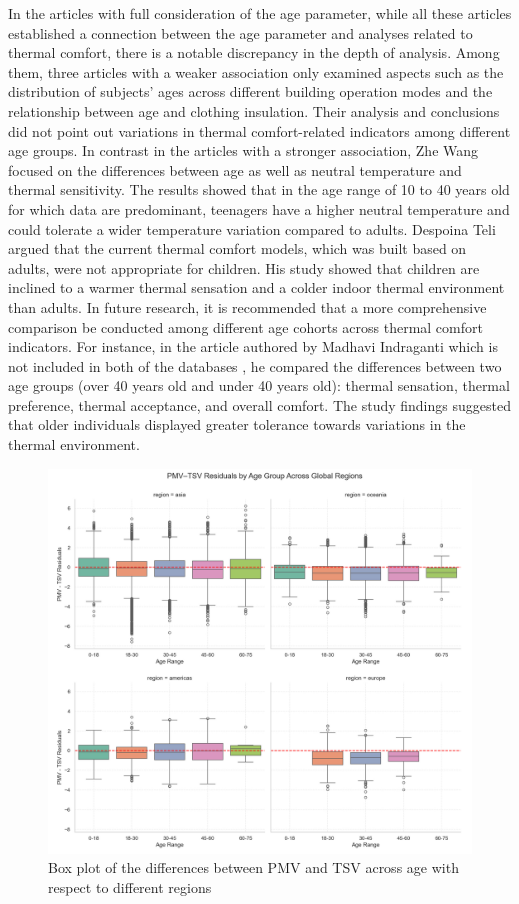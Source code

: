 \documentclass[final,3p,times,12pt]{elsarticle}
\begin{document}
In the articles with full consideration of the age parameter, while all these articles established a connection between the age parameter and analyses related to thermal comfort, there is a notable discrepancy in the depth of analysis. Among them, three articles with a weaker association \cite{honnekeriComfortAdaptationMixedmode,tartariniThermalPerceptionsPreferences2018,vecchiThermalHistoryIts} only examined aspects such as the distribution of subjects' ages across different building operation modes and the relationship between age and clothing insulation. Their analysis and conclusions did not point out variations in thermal comfort-related indicators among different age groups. In contrast in the articles with a stronger association, Zhe Wang \cite{wangRevisitingIndividualGroup2020b} focused on the differences between age as well as neutral temperature and thermal sensitivity. The results showed that in the age range of 10 to 40 years old for which data are predominant, teenagers have a higher neutral temperature and could tolerate a wider temperature variation compared to adults. Despoina Teli \cite{teliNaturallyVentilatedClassrooms2012} argued that the current thermal comfort models, which was built based on adults, were not appropriate for children. His study showed that children are inclined to a warmer thermal sensation and a colder indoor thermal environment than adults. In future research, it is recommended that a more comprehensive comparison be conducted among different age cohorts across thermal comfort indicators. For instance, in the article authored by Madhavi Indraganti which is not included in both of the databases \cite{indragantiEffectAgeGender2010}, he compared the differences between two age groups (over 40 years old and under 40 years old): thermal sensation, thermal preference, thermal acceptance, and overall comfort. The study findings suggested that older individuals displayed greater tolerance towards variations in the thermal environment.

\begin{figure}[h!]
    \centering
    \includegraphics[width=0.8\linewidth]{facet_age_residuals_new.jpg}
    \caption{Box plot of the differences between PMV and TSV across age with respect to different regions}
    \label{5}
\end{figure}
\end{document}
